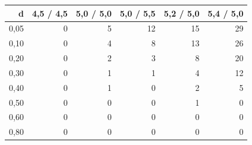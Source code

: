 \begin{tabular}{rrrrrr}
\toprule
\textbf{d} & \textbf{4,5 / 4,5} & \textbf{5,0 / 5,0} & \textbf{5,0 / 5,5} & \textbf{5,2 / 5,0} & \textbf{5,4 / 5,0} \\
\midrule
0,05 & 0 & 5 & 12 & 15 & 29 \\
0,10 & 0 & 4 & 8 & 13 & 26 \\
0,20 & 0 & 2 & 3 & 8 & 20 \\
0,30 & 0 & 1 & 1 & 4 & 12 \\
0,40 & 0 & 1 & 0 & 2 & 5 \\
0,50 & 0 & 0 & 0 & 1 & 0 \\
0,60 & 0 & 0 & 0 & 0 & 0 \\
0,80 & 0 & 0 & 0 & 0 & 0 \\
\bottomrule
\end{tabular}
